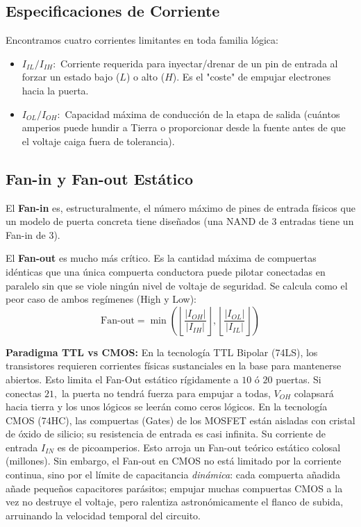 \subsection{Especificaciones de Corriente}
Encontramos cuatro corrientes limitantes en toda familia lógica:
\begin{itemize}
    \item $I_{IL} / I_{IH}:$ Corriente requerida para inyectar/drenar de un pin de entrada al forzar un estado bajo ($L$) o alto ($H$). Es el "coste" de empujar electrones hacia la puerta.
    \item $I_{OL} / I_{OH}:$ Capacidad máxima de conducción de la etapa de salida (cuántos amperios puede hundir a Tierra o proporcionar desde la fuente antes de que el voltaje caiga fuera de tolerancia).
\end{itemize}

\subsection{Fan-in y Fan-out Estático}
El \textbf{Fan-in} es, estructuralmente, el número máximo de pines de entrada físicos que un modelo de puerta concreta tiene diseñados (una NAND de 3 entradas tiene un Fan-in de 3).

El \textbf{Fan-out} es mucho más crítico. Es la cantidad máxima de compuertas idénticas que una única compuerta conductora puede pilotar conectadas en paralelo sin que se viole ningún nivel de voltaje de seguridad. Se calcula como el peor caso de ambos regímenes (High y Low):
\[ \text{Fan-out} = \min \left( \left\lfloor \frac{|I_{OH}|}{|I_{IH}|} \right\rfloor, \left\lfloor \frac{|I_{OL}|}{|I_{IL}|} \right\rfloor \right) \]

\textbf{Paradigma TTL vs CMOS:} En la tecnología TTL Bipolar (74LS), los transistores requieren corrientes físicas sustanciales en la base para mantenerse abiertos. Esto limita el Fan-Out estático rígidamente a $10 \text{ ó } 20$ puertas. Si conectas $21,$ la puerta no tendrá fuerza para empujar a todas, $V_{OH}$ colapsará hacia tierra y los unos lógicos se leerán como ceros lógicos. 
En la tecnología CMOS (74HC), las compuertas (Gates) de los MOSFET están aisladas con cristal de óxido de silicio; su resistencia de entrada es casi infinita. Su corriente de entrada $I_{IN}$ es de picoamperios. Esto arroja un Fan-out teórico estático colosal (millones). Sin embargo, el Fan-out en CMOS no está limitado por la corriente continua, sino por el límite de capacitancia \textit{dinámica}: cada compuerta añadida añade pequeños capacitores parásitos; empujar muchas compuertas CMOS a la vez no destruye el voltaje, pero ralentiza astronómicamente el flanco de subida, arruinando la velocidad temporal del circuito.

